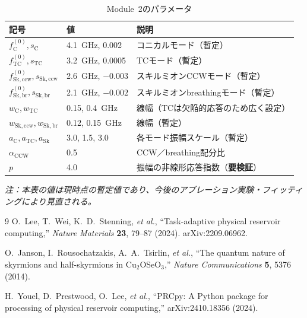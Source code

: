 \documentclass[11pt,a4paper]{ltjsarticle}
\begin{document}
\begin{table}[htbp]
\centering
\caption{Module~2のパラメータ}
\label{tab:params_m2}
\small
\begin{tabular}{@{}llp{58mm}@{}}
\toprule
\textbf{記号} & \textbf{値} & \textbf{説明} \\
\midrule
$f_\mathrm{C}^{(0)}, s_\mathrm{C}$ & \SI{4.1}{GHz}, 0.002 & コニカルモード（暫定） \\
$f_\mathrm{TC}^{(0)}, s_\mathrm{TC}$ & \SI{3.2}{GHz}, 0.0005 & TCモード（暫定） \\
$f_\mathrm{Sk,ccw}^{(0)}, s_\mathrm{Sk,ccw}$ & \SI{2.6}{GHz}, $-0.003$ & スキルミオンCCWモード（暫定） \\
$f_\mathrm{Sk,br}^{(0)}, s_\mathrm{Sk,br}$ & \SI{2.1}{GHz}, $-0.002$ & スキルミオンbreathingモード（暫定） \\
$w_\mathrm{C}, w_\mathrm{TC}$ & 0.15, \SI{0.4}{GHz} & 線幅（TCは欠陥的応答のため広く設定） \\
$w_\mathrm{Sk,ccw}, w_\mathrm{Sk,br}$ & 0.12, \SI{0.15}{GHz} & 線幅（暫定） \\
$a_\mathrm{C}, a_\mathrm{TC}, a_\mathrm{Sk}$ & 3.0, 1.5, 3.0 & 各モード振幅スケール（暫定） \\
$\alpha_\mathrm{CCW}$ & 0.5 & CCW／breathing配分比 \\
$p$ & 4.0 & 振幅の非線形応答指数（\textbf{要検証}） \\
\bottomrule
\end{tabular}
\end{table}

\noindent\textit{注：本表の値は現時点の暫定値であり、今後のアブレーション実験・フィッティングにより見直される。}

\newpage
\begin{thebibliography}{9}
O.~Lee, T.~Wei, K.~D.~Stenning, \textit{et al.},
``Task-adaptive physical reservoir computing,''
\textit{Nature Materials} \textbf{23}, 79--87 (2024). arXiv:2209.06962.

O.~Janson, I.~Rousochatzakis, A.~A.~Tsirlin, \textit{et al.},
``The quantum nature of skyrmions and half-skyrmions in Cu$_2$OSeO$_3$,''
\textit{Nature Communications} \textbf{5}, 5376 (2014).

H.~Youel, D.~Prestwood, O.~Lee, \textit{et al.},
``PRCpy: A Python package for processing of physical reservoir computing,''
arXiv:2410.18356 (2024).
\end{thebibliography}
\end{document}
